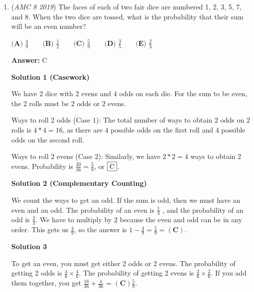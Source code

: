 \begin{enumerate}
 -- Rayansh Mankad(SharpWhiz17)

 


 -- ChillGuyDoesMath :)

 Associated video

 Solution detailing how to solve the problem: 

 


	\item (\textit{AMC 8 2019}) The faces of each of two fair dice are numbered 1, 2, 3, 5, 7, and 8. When the two dice are tossed, what is the probability that their sum will be an even number?


 $\textbf{(A) }\frac{4}{9}\qquad\textbf{(B) }\frac{1}{2}\qquad\textbf{(C) }\frac{5}{9}\qquad\textbf{(D) }\frac{3}{5}\qquad\textbf{(E) }\frac{2}{3}$

 \textbf{Answer: }C



\textbf{Solution 1 (Casework)}

We have $2$ dice with $2$ evens and $4$ odds on each die. For the sum to be even, the 2 rolls must be $2$ odds or $2$ evens. 

 Ways to roll $2$ odds (Case $1$): The total number of ways to obtain $2$ odds on 2 rolls is $4*4=16$, as there are $4$ possible odds on the first roll and $4$ possible odds on the second roll.

 Ways to roll $2$ evens (Case $2$): Similarly, we have $2*2=4$ ways to obtain 2 evens. Probability is $\frac{20}{36}=\frac{5}{9}$, or $\framebox{C}$.

 



\textbf{Solution 2 (Complementary Counting)}

We count the ways to get an odd. If the sum is odd, then we must have an even and an odd. The probability of an even is $\frac{1}{3}$ , and the probability of an odd is $\frac{2}{3}$. We have to multiply by $2$ because the even and odd can be in any order. This gets us $\frac{4}{9}$, so the answer is $1 - \frac{4}{9} = \frac{5}{9} = \boxed{(\textbf{C})}$.

 



\textbf{Solution 3}

To get an even, you must get either 2 odds or 2 evens. The probability of getting 2 odds is $\frac{4}{6} \times \frac{4}{6}$. The probability of getting 2 evens is $\frac{2}{6} \times \frac{2}{6}$. If you add them together, you get $\frac{16}{36} + \frac{4}{36}$ = $\boxed{(\textbf{C})  \frac{5}{9}}$.


\end{enumerate}
